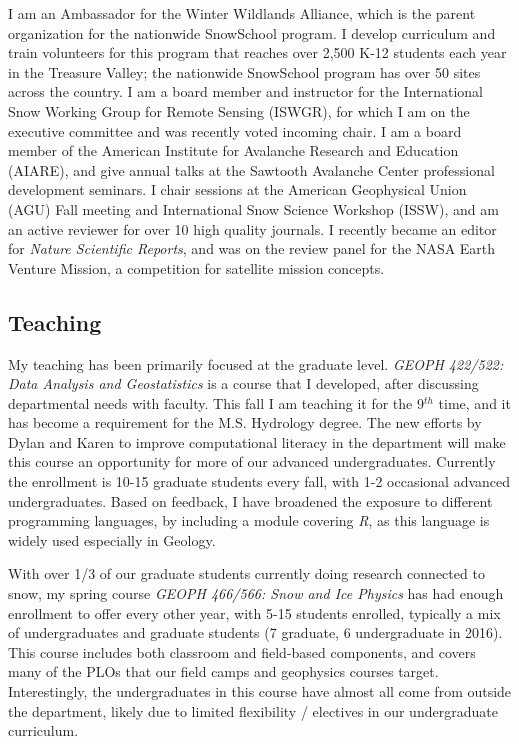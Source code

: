 \documentclass[11pt]{article}
\begin{document}
I am an Ambassador for the Winter Wildlands Alliance, which is the parent organization for the nationwide SnowSchool program.  I develop curriculum and train volunteers for this program that reaches over 2,500 K-12 students each year in the Treasure Valley; the nationwide SnowSchool program has over 50 sites across the country.  I am a board member and instructor for the International Snow Working Group for Remote Sensing (ISWGR), for which I am on the executive committee and was recently voted incoming chair.  I am a board member of the American Institute for Avalanche Research and Education (AIARE), and give annual talks at the Sawtooth Avalanche Center professional development seminars.  I chair sessions at the American Geophysical Union (AGU) Fall meeting and International Snow Science Workshop (ISSW), and am an active reviewer for over 10 high quality journals.  I recently became an editor for \textit{Nature Scientific Reports}, and was on the review panel for the NASA Earth Venture Mission, a competition for satellite mission concepts.

\subsection{Teaching}

My teaching has been primarily focused at the graduate level.  \textit{GEOPH 422/522: Data Analysis and Geostatistics} is a course that I developed, after discussing departmental needs with faculty.  This fall I am teaching it for the 9$^{th}$ time, and it has become a requirement for the M.S. Hydrology degree.  The new efforts by Dylan and Karen to improve computational literacy in the department will make this course an opportunity for more of our advanced undergraduates.  Currently the enrollment is 10-15 graduate students every fall, with 1-2 occasional advanced undergraduates.  Based on feedback, I have broadened the exposure to different programming languages, by including a module covering \textit{R}, as this language is widely used especially in Geology.  

With over 1/3 of our graduate students currently doing research connected to snow, my spring course \textit{GEOPH 466/566: Snow and Ice Physics} has had enough enrollment to offer every other year, with 5-15 students enrolled, typically a mix of undergraduates and graduate students (7 graduate, 6 undergraduate in 2016).  This course includes both classroom and field-based components, and covers many of the PLOs that our field camps and geophysics courses target.  Interestingly, the undergraduates in this course have almost all come from outside the department, likely due to limited flexibility / electives in our undergraduate curriculum.  
\end{document}

